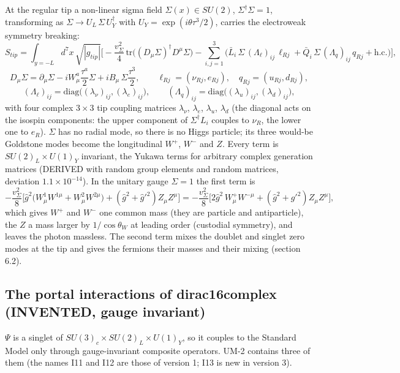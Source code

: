 \documentclass[
  10pt,
]{article}
\begin{document}
At the regular tip a non-linear sigma field \(\Sigma(x) \in SU(2)\),
\(\Sigma^\dagger\Sigma = 1\), transforming as
\(\Sigma \to U_L\,\Sigma\,U_Y^\dagger\) with
\(U_Y = \exp(i\theta\tau^3/2)\), carries the electroweak symmetry
breaking:
\[ S_{tip} = \int_{y = -L} d^7x\,\sqrt{|g_{tip}|}\Big[-\frac{v_\Sigma^2}{4}\,\mathrm{tr}\big((D_\mu\Sigma)^\dagger D^\mu\Sigma\big)
   - \sum_{i,j=1}^{3}\big(\bar L_i\,\Sigma\,(\Lambda_\ell)_{ij}\,\ell_{Rj} + \bar Q_i\,\Sigma\,(\Lambda_q)_{ij}\,q_{Rj} + \text{h.c.}\big)\Big], \]
\[ D_\mu\Sigma = \partial_\mu\Sigma - iW^a_\mu\frac{\tau^a}{2}\Sigma + iB_\mu\,\Sigma\frac{\tau^3}{2},\qquad
   \ell_{Rj} = (\nu_{Rj}, e_{Rj}),\quad q_{Rj} = (u_{Rj}, d_{Rj}),\]
\[ (\Lambda_\ell)_{ij} = \mathrm{diag}\big((\lambda_\nu)_{ij}, (\lambda_e)_{ij}\big),\qquad (\Lambda_q)_{ij} = \mathrm{diag}\big((\lambda_u)_{ij}, (\lambda_d)_{ij}\big),\]
with four complex \(3\times3\) tip coupling matrices \(\lambda_\nu\),
\(\lambda_e\), \(\lambda_u\), \(\lambda_d\) (the diagonal acts on the
isospin components: the upper component of \(\Sigma^\dagger L_i\)
couples to \(\nu_R\), the lower one to \(e_R\)). \(\Sigma\) has no
radial mode, so there is no Higgs particle; its three would-be Goldstone
modes become the longitudinal \(W^+\), \(W^-\) and \(Z\). Every term is
\(SU(2)_L\times U(1)_Y\) invariant, the Yukawa terms for arbitrary
complex generation matrices (DERIVED with random group elements and
random matrices, deviation \(1.1\times10^{-14}\)). In the unitary gauge
\(\Sigma = 1\) the first term is
\[ -\frac{v_\Sigma^2}{8}\Big[\hat g^2\big(W^1_\mu W^{1\mu} + W^2_\mu W^{2\mu}\big) + (\hat g^2 + \hat g'^2) Z_\mu Z^\mu\Big]
   = -\frac{v_\Sigma^2}{8}\Big[2\hat g^2\,W^+_\mu W^{-\mu} + (\hat g^2 + \hat g'^2) Z_\mu Z^\mu\Big] ,\]
which gives \(W^+\) and \(W^-\) one common mass (they are particle and
antiparticle), the \(Z\) a mass larger by \(1/\cos\theta_W\) at leading
order (custodial symmetry), and leaves the photon massless. The second
term mixes the doublet and singlet zero modes at the tip and gives the
fermions their masses and their mixing (section 6.2).

\hypertarget{the-portal-interactions-of-dirac16complex-invented-gauge-invariant}{%
\subsection{The portal interactions of dirac16complex (INVENTED, gauge
invariant)}\label{the-portal-interactions-of-dirac16complex-invented-gauge-invariant}}

\(\Psi\) is a singlet of \(SU(3)_c\times SU(2)_L\times U(1)_Y\), so it
couples to the Standard Model only through gauge-invariant composite
operators. UM-2 contains three of them (the names I11 and I12 are those
of version 1; I13 is new in version 3).
\end{document}
